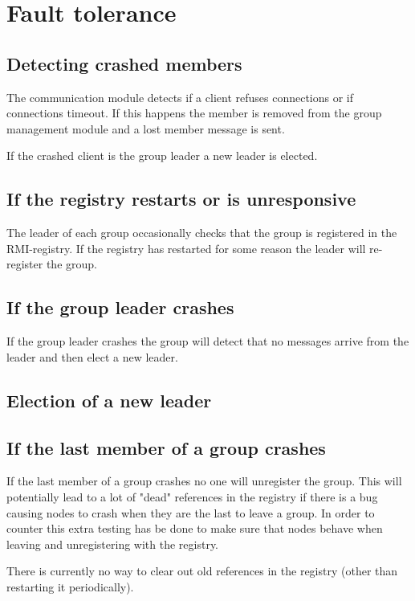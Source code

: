 \documentclass[english]{article}
\begin{document}
\section{Fault tolerance}
\subsection{Detecting crashed members}
The communication module detects if a client refuses connections or if connections timeout. If this happens the member is removed from the group management module and a lost member message is sent.

If the crashed client is the group leader a new leader is elected.

\subsection{If the registry restarts or is unresponsive}
The leader of each group occasionally checks that the group is registered in the RMI-registry. If the registry has restarted for some reason the leader will re-register the group.

\subsection{If the group leader crashes}
If the group leader crashes the group will detect that no messages arrive from the leader and then elect a new leader. 

\subsection{Election of a new leader}

\subsection{If the last member of a group crashes}
If the last member of a group crashes no one will unregister the group.
This will potentially lead to a lot of "dead" references in the registry if there is a bug causing nodes to crash when they are the last to leave a group. In order to counter this extra testing has be done to make sure that nodes behave when leaving and unregistering with the registry.

There is currently no way to clear out old references in the registry (other than restarting it periodically).
\end{document}
